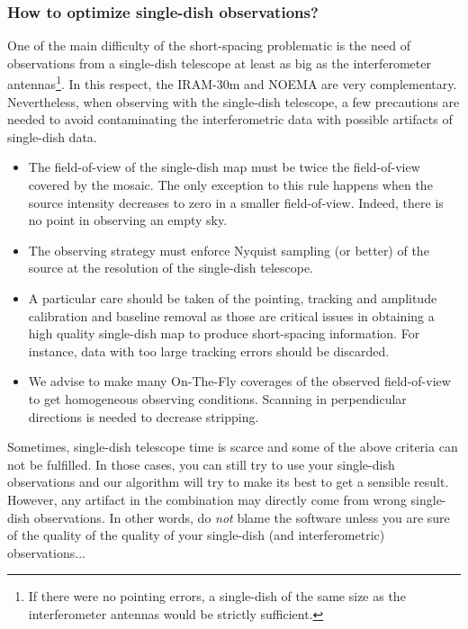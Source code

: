 \subsubsection{How to optimize single-dish observations?}

One of the main difficulty of the short-spacing problematic is the need of
observations from a single-dish telescope at least as big as the
interferometer antennas\footnote{If there were no pointing errors,
a single-dish of the same size as the interferometer antennas
would be strictly sufficient.}. In this respect, the IRAM-30m and NOEMA are very
complementary. Nevertheless, when observing with the single-dish telescope,
a few precautions are needed to avoid contaminating the interferometric
data with possible artifacts of single-dish data.
\begin{itemize}\itemsep 0pt
\item The field-of-view of the single-dish map must be twice the
  field-of-view covered by the mosaic. The only exception to this rule
  happens when the source intensity decreases to zero in a smaller
  field-of-view. Indeed, there is no point in observing an empty sky.
\item The observing strategy must enforce Nyquist sampling (or better) of
  the source at the resolution of the single-dish telescope.
\item A particular care should be taken of the pointing, tracking and
  amplitude calibration and baseline removal as those are critical issues
  in obtaining a high quality single-dish map to produce short-spacing
  information. For instance, data with too large tracking errors should be
  discarded.
\item We advise to make many On-The-Fly coverages of the observed
  field-of-view to get homogeneous observing conditions. Scanning in
  perpendicular directions is needed to decrease stripping.
\end{itemize}
Sometimes, single-dish telescope time is scarce and some of the above
criteria can not be fulfilled. In those cases, you can still try to use
your single-dish observations and our algorithm will try to make its best
to get a sensible result. However, any artifact in the combination may
directly come from wrong single-dish observations. In other words, do
\emph{not} blame the software unless you are sure of the quality of the
quality of your single-dish (and interferometric) observations...

